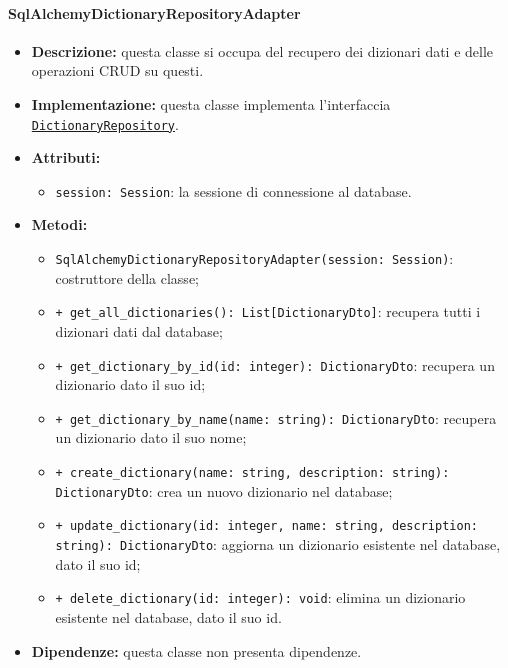 \paragraph{SqlAlchemyDictionaryRepositoryAdapter} \label{SqlAlchemyDictionaryRepositoryAdapter}
\begin{itemize}
    \item \textbf{Descrizione:} questa classe si occupa del recupero dei dizionari dati e delle operazioni CRUD su questi.
    \item \textbf{Implementazione:} questa classe implementa l'interfaccia \hyperref[DictionaryRepository]{\texttt{DictionaryRepository}}.
    \item \textbf{Attributi:}
    \begin{itemize}
        \item \texttt{session: Session}: la sessione di connessione al database.
    \end{itemize}
    \item \textbf{Metodi:}
    \begin{itemize}
        \item \texttt{SqlAlchemyDictionaryRepositoryAdapter(session: Session)}: costruttore della classe;
        \item \texttt{+ get\_all\_dictionaries(): List[DictionaryDto]}: recupera tutti i dizionari dati dal database;
        \item \texttt{+ get\_dictionary\_by\_id(id: integer): DictionaryDto}: recupera un dizionario dato il suo id;
        \item \texttt{+ get\_dictionary\_by\_name(name: string): DictionaryDto}: recupera un dizionario dato il suo nome;
        \item \texttt{+ create\_dictionary(name: string, description: string): DictionaryDto}: crea un nuovo dizionario nel database;
        \item \texttt{+ update\_dictionary(id: integer, name: string, description: string): DictionaryDto}: aggiorna un dizionario esistente nel database, dato il suo id;
        \item \texttt{+ delete\_dictionary(id: integer): void}: elimina un dizionario esistente nel database, dato il suo id.
    \end{itemize}
    \item \textbf{Dipendenze:} questa classe non presenta dipendenze.
\end{itemize} 

